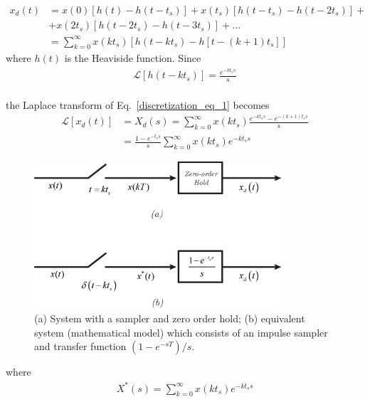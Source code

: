 \documentclass[11pt,a4paper,oneside]{book}
\numberwithin{equation}{section}
\theoremstyle{it}
\theoremstyle{definition}
\begin{document}
\begin{equation}\label{discretization_eq_1}
	\begin{split}
		x_d(t) & = x(0)\left[ h(t)-h(t-t_s)\right] + x(t_s)\left[ h(t-t_s)-h(t-2t_s)\right] + \\[6pt]
		&+ x(2t_s)\left[ h(t-2t_s)-h(t-3t_s)\right] + ... \\[6pt]
		& = \sum_{k=0}^{\infty}x(kt_s)\left[h(t-kt_s)-h\left[ t-(k+1)t_s\right] \right] 
	\end{split}
\end{equation}
where $h(t)$ is the Heaviside function.
Since
\begin{equation*}\label{discretization_eq_2}
	\begin{split}
		\mathcal{L}\left[ h(t-kt_s) \right] = \frac{e^{-kt_ss}}{s}  
	\end{split}
\end{equation*}\\
the Laplace transform of Eq.~\eqref{discretization_eq_1} becomes
\begin{equation}\label{discretization_eq_3}
	\begin{split}
		\mathcal{L}\left[x_d(t)\right] &= X_d(s) = \sum_{k=0}^{\infty}x(kt_s)\frac{e^{-kt_ss}-e^{-(k+1)t_ss}}{s} \\[6pt]
		&= \frac{1-e^{-t_ss}}{s}\sum_{k=0}^{\infty} x(kt_s)e^{-kt_ss}
	\end{split}
\end{equation}
\begin{figure}[H]
	\centering
	\includegraphics[width = 260pt, 
	keepaspectratio]{figures/discretization/sampling.eps}
	\captionsetup{width=0.5\textwidth, font=small}		
	\caption{(a) System with a sampler and zero order hold; (b) equivalent 
	system (mathematical model) which consists of an impulse sampler and 
	transfer function $(1-e^{-sT})/s$.}
	\label{figure_sampling}
\end{figure}
where 
\begin{equation}\label{discretization_eq_4}
	\begin{split}
		X^*(s) = \sum_{k=0}^{\infty} x(kt_s)e^{-kt_ss} 
	\end{split}
\end{equation}
\end{document}
